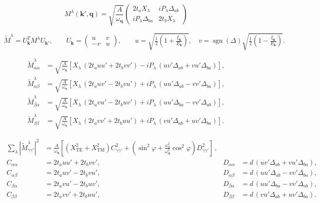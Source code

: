 \documentclass[a4paper,10pt]{article}
\begin{document}
\begin{equation}
M^{\lambda}(\mathbf{k}',\mathbf{q}) = \sqrt{\frac{A}{\omega_{\mathbf{q}}}}
\begin{pmatrix}
2t_a X_\lambda & i P_\lambda \Delta_{ab}\\
i P_\lambda \Delta_{ba} & 2t_b X_\lambda
\end{pmatrix}
\end{equation}

\begin{equation}
\widetilde{M}^{\lambda} = U_{\mathbf{k}}^{T} M^{\lambda} U_{\mathbf{k}'}, \qquad
U_{\mathbf{k}} = \begin{pmatrix} u & v\\ -v & u \end{pmatrix}, \qquad
u = \sqrt{\tfrac12\left(1+\tfrac{\xi_{\mathbf{k}}}{E_{\mathbf{k}}}\right)}, \quad
v = \operatorname{sgn}(\Delta)\sqrt{\tfrac12\left(1-\tfrac{\xi_{\mathbf{k}}}{E_{\mathbf{k}}}\right)} .
\end{equation}

\begin{align}
\widetilde{M}^{\lambda}_{\alpha\alpha} &= \sqrt{\frac{A}{\omega_{\mathbf{q}}}} \left[ X_\lambda\,(2t_a uu' + 2t_b vv') - i P_\lambda\,(uv'\Delta_{ab} + vu'\Delta_{ba}) \right],\\
\widetilde{M}^{\lambda}_{\alpha\beta} &= \sqrt{\frac{A}{\omega_{\mathbf{q}}}} \left[ X_\lambda\,(2t_a uv' - 2t_b vu') + i P_\lambda\,(uu'\Delta_{ab} - vv'\Delta_{ba}) \right],\\
\widetilde{M}^{\lambda}_{\beta\alpha} &= \sqrt{\frac{A}{\omega_{\mathbf{q}}}} \left[ X_\lambda\,(2t_a vu' - 2t_b uv') + i P_\lambda\,(uu'\Delta_{ba} - vv'\Delta_{ab}) \right],\\
\widetilde{M}^{\lambda}_{\beta\beta} &= \sqrt{\frac{A}{\omega_{\mathbf{q}}}} \left[ X_\lambda\,(2t_a vv' + 2t_b uu') + i P_\lambda\,(vu'\Delta_{ab} + uv'\Delta_{ba}) \right].
\end{align}

\begin{align}
\sum_{\lambda}\left|\widetilde{M}^{\lambda}_{\gamma\gamma'}\right|^2
&= \frac{A}{\omega_{\mathbf{q}}}\left[
\left(X_{\mathrm{TE}}^2 + X_{\mathrm{TM}}^2\right) C_{\gamma\gamma'}^2
+ \left(\sin^2\varphi + \frac{\omega_0^2}{\omega_{\mathbf{q}}^2}\cos^2\varphi\right) D_{\gamma\gamma'}^2 \right]\,,\\
C_{\alpha\alpha} &= 2t_a uu' + 2t_b vv', & D_{\alpha\alpha} &= d\,(uv'\Delta_{ab} + vu'\Delta_{ba}),\\
C_{\alpha\beta} &= 2t_a uv' - 2t_b vu', & D_{\alpha\beta} &= d\,(uu'\Delta_{ab} - vv'\Delta_{ba}),\\
C_{\beta\alpha} &= 2t_a vu' - 2t_b uv', & D_{\beta\alpha} &= d\,(uu'\Delta_{ba} - vv'\Delta_{ab}),\\
C_{\beta\beta} &= 2t_a vv' + 2t_b uu', & D_{\beta\beta} &= d\,(vu'\Delta_{ab} + uv'\Delta_{ba}).
\end{align}
\end{document}
